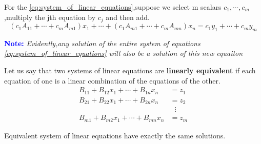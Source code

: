 \documentclass[11pt, a4paper, oneside,UTF8]{ctexbook}
\newenvironment{note}
{\par\textcolor{blue}{\bfseries Note:}\itshape}
{\par}
\newtheorem[M]{theorem}{Theorem}[section]
\newtheorem[M]{lemma}[theorem]{Lemma}
\newtheorem[M]{proposition}[theorem]{Proposition}
\newtheorem[M]{corollary}[theorem]{Corollary}
\newtheorem[M]{definition}{Definition}[section]
\newtheorem[M]{example}{Example}[section]
\newtheorem[M]{remark}{Remark}[section]
\begin{document}
\begin{definition}
	For the \ref{eq:system_of_linear_equations},suppose we select m scalars $c_1,\cdots,c_m$,multiply the jth equation by $c_j$ and then add.
	\begin{displaymath}
		(c_1A_{11}+\cdots+c_mA_{m1})x_1+\cdots+(c_1A_{m1}+\cdots+c_mA_{mn})x_n = c_1y_1+\cdots+c_my_m
	\end{displaymath}
\end{definition}

\begin{note}
	Evidently,any solution of the entire system of equations \ref{eq:system_of_linear_equations} will also be a solution of this new equaiton
\end{note}

\begin{definition}
	Let us say that two systems of linear equations are \textbf{linearly equivalent} if each equation of one is a linear combination of the equations of the other.
	\begin{equation}
		\begin{aligned}
			B_{11}+B_{12}x_1+\cdots+B_{1n}x_n & = z_1           \\
			B_{21}+B_{22}x_1+\cdots+B_{2n}x_n & = z_2           \\
			                                  & \,\,\,\, \vdots \\
			B_{m1}+B_{m2}x_1+\cdots+B_{mn}x_n & = z_m
		\end{aligned}
		\label{eq:linear_equivalent}
	\end{equation}
\end{definition}

\begin{theorem}
	Equivalent system of linear equations have exactly the same solutions.
\end{theorem}
\end{document}
